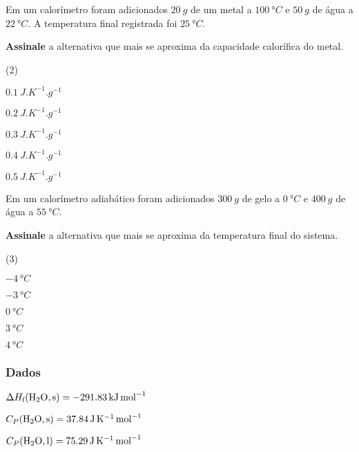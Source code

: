\documentclass[braun, twocolumn]{braun}
\begin{document}
\begin{problem}
[2A05]Em um calorímetro foram adicionados \(\qty{20}{g}\) de um metal a
\(\qty{100}{\degree C}\) e \(\qty{50}{g}\) de água a \(\qty{22}{\degree C}\).
A temperatura final registrada foi \(\qty{25}{\degree C}\).

\textbf{Assinale} a alternativa que mais se aproxima da capacidade
calorífica do metal.


\begin{choices}
(2)
\item \(\qty{0,1}{J.K^{-1}.g^{-1}}\)

\item \(\qty{0,2}{J.K^{-1}.g^{-1}}\)

\item \(\qty{0,3}{J.K^{-1}.g^{-1}}\)

\item \(\qty{0,4}{J.K^{-1}.g^{-1}}\)

\item \(\qty{0,5}{J.K^{-1}.g^{-1}}\)

\end{choices}

\end{problem}



\begin{problem}
[2A06]Em um calorímetro adiabático foram adicionados \(\qty{300}{g}\) de gelo a
\(\qty{0}{\degree C}\) e \(\qty{400}{g}\) de água a \(\qty{55}{\degree C}\).

\textbf{Assinale} a alternativa que mais se aproxima da temperatura
final do sistema.


\begin{choices}
(3)
\item \(\qty{-4}{\degree C}\)

\item \(\qty{-3}{\degree C}\)

\item \(\qty{0}{\degree C}\)

\item \(\qty{3}{\degree C}\)

\item \(\qty{4}{\degree C}\)

\end{choices}
\subsubsection*{Dados}


\begin{datalist}

\item $\Delta H_\text{f}(\ce{H2O, {s}}) = \qty{-291,83}{kJ.mol^{-1}}$
\item $C_P(\ce{H2O, {s}}) = \qty{37,84}{J.K^{-1}.mol^{-1}}$
\item $C_P(\ce{H2O, {l}}) = \qty{75,29}{J.K^{-1}.mol^{-1}}$
\end{datalist}

\end{problem}
\end{document}
